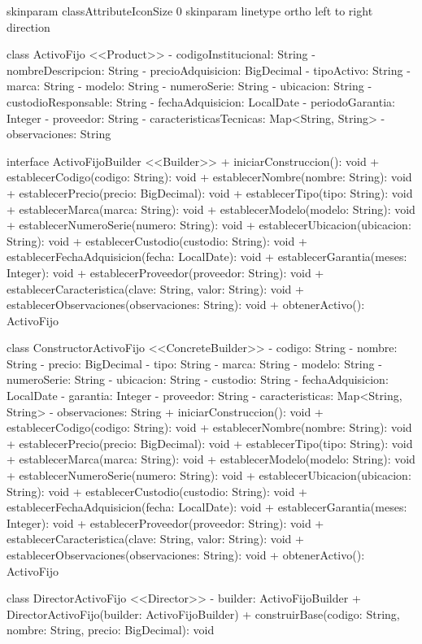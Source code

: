 skinparam classAttributeIconSize 0
skinparam linetype ortho
left to right direction

class ActivoFijo <<Product>> {
  - codigoInstitucional: String
  - nombreDescripcion: String
  - precioAdquisicion: BigDecimal
  - tipoActivo: String
  - marca: String
  - modelo: String
  - numeroSerie: String
  - ubicacion: String
  - custodioResponsable: String
  - fechaAdquisicion: LocalDate
  - periodoGarantia: Integer
  - proveedor: String
  - caracteristicasTecnicas: Map<String, String>
  - observaciones: String
}

interface ActivoFijoBuilder <<Builder>> {
  + iniciarConstruccion(): void
  + establecerCodigo(codigo: String): void
  + establecerNombre(nombre: String): void
  + establecerPrecio(precio: BigDecimal): void
  + establecerTipo(tipo: String): void
  + establecerMarca(marca: String): void
  + establecerModelo(modelo: String): void
  + establecerNumeroSerie(numero: String): void
  + establecerUbicacion(ubicacion: String): void
  + establecerCustodio(custodio: String): void
  + establecerFechaAdquisicion(fecha: LocalDate): void
  + establecerGarantia(meses: Integer): void
  + establecerProveedor(proveedor: String): void
  + establecerCaracteristica(clave: String, valor: String): void
  + establecerObservaciones(observaciones: String): void
  + obtenerActivo(): ActivoFijo
}

class ConstructorActivoFijo <<ConcreteBuilder>> {
  - codigo: String
  - nombre: String
  - precio: BigDecimal
  - tipo: String
  - marca: String
  - modelo: String
  - numeroSerie: String
  - ubicacion: String
  - custodio: String
  - fechaAdquisicion: LocalDate
  - garantia: Integer
  - proveedor: String
  - caracteristicas: Map<String, String>
  - observaciones: String
  + iniciarConstruccion(): void
  + establecerCodigo(codigo: String): void
  + establecerNombre(nombre: String): void
  + establecerPrecio(precio: BigDecimal): void
  + establecerTipo(tipo: String): void
  + establecerMarca(marca: String): void
  + establecerModelo(modelo: String): void
  + establecerNumeroSerie(numero: String): void
  + establecerUbicacion(ubicacion: String): void
  + establecerCustodio(custodio: String): void
  + establecerFechaAdquisicion(fecha: LocalDate): void
  + establecerGarantia(meses: Integer): void
  + establecerProveedor(proveedor: String): void
  + establecerCaracteristica(clave: String, valor: String): void
  + establecerObservaciones(observaciones: String): void
  + obtenerActivo(): ActivoFijo
}

class DirectorActivoFijo <<Director>> {
  - builder: ActivoFijoBuilder
  + DirectorActivoFijo(builder: ActivoFijoBuilder)
  + construirBase(codigo: String, nombre: String, precio: BigDecimal): void
}

